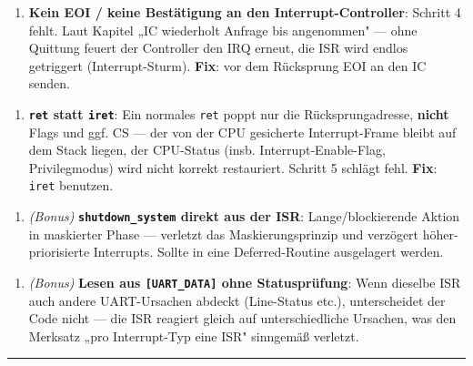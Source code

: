 \documentclass[11pt, a4paper]{article}
\begin{document}
\begin{enumerate}
  \item \textbf{Kein EOI / keine Bestätigung an den Interrupt-Controller}: Schritt 4 fehlt. Laut Kapitel „IC wiederholt Anfrage bis angenommen" — ohne Quittung feuert der Controller den IRQ erneut, die ISR wird endlos getriggert (Interrupt-Sturm). \textbf{Fix}: vor dem Rücksprung EOI an den IC senden.
\end{enumerate}

\begin{enumerate}
  \item \textbf{\texttt{ret} statt \texttt{iret}}: Ein normales \texttt{ret} poppt nur die Rücksprungadresse, \textbf{nicht} Flags und ggf. CS — der von der CPU gesicherte Interrupt-Frame bleibt auf dem Stack liegen, der CPU-Status (insb. Interrupt-Enable-Flag, Privilegmodus) wird nicht korrekt restauriert. Schritt 5 schlägt fehl. \textbf{Fix}: \texttt{iret} benutzen.
\end{enumerate}

\begin{enumerate}
  \item \textit{(Bonus)} \textbf{\texttt{shutdown\_system} direkt aus der ISR}: Lange/blockierende Aktion in maskierter Phase — verletzt das Maskierungsprinzip und verzögert höher-priorisierte Interrupts. Sollte in eine Deferred-Routine ausgelagert werden.
\end{enumerate}

\begin{enumerate}
  \item \textit{(Bonus)} \textbf{Lesen aus \texttt{[UART\_DATA]} ohne Statusprüfung}: Wenn dieselbe ISR auch andere UART-Ursachen abdeckt (Line-Status etc.), unterscheidet der Code nicht — die ISR reagiert gleich auf unterschiedliche Ursachen, was den Merksatz „pro Interrupt-Typ eine ISR" sinngemäß verletzt.
\end{enumerate}


\noindent\textcolor{rulegray}{\rule{\linewidth}{0.4pt}}





\end{document}
